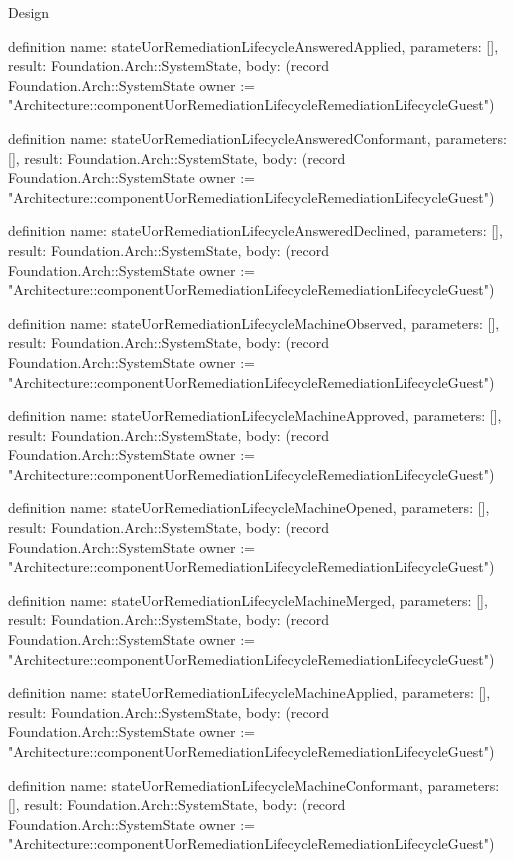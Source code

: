 \begin{lexlean}{Design}
\begin{semanticmodule}
definition{
  name: stateUorRemediationLifecycleAnsweredApplied,
  parameters: [],
  result: Foundation.Arch::SystemState,
  body: (record Foundation.Arch::SystemState {owner := "Architecture::componentUorRemediationLifecycleRemediationLifecycleGuest"})
}

definition{
  name: stateUorRemediationLifecycleAnsweredConformant,
  parameters: [],
  result: Foundation.Arch::SystemState,
  body: (record Foundation.Arch::SystemState {owner := "Architecture::componentUorRemediationLifecycleRemediationLifecycleGuest"})
}

definition{
  name: stateUorRemediationLifecycleAnsweredDeclined,
  parameters: [],
  result: Foundation.Arch::SystemState,
  body: (record Foundation.Arch::SystemState {owner := "Architecture::componentUorRemediationLifecycleRemediationLifecycleGuest"})
}

definition{
  name: stateUorRemediationLifecycleMachineObserved,
  parameters: [],
  result: Foundation.Arch::SystemState,
  body: (record Foundation.Arch::SystemState {owner := "Architecture::componentUorRemediationLifecycleRemediationLifecycleGuest"})
}

definition{
  name: stateUorRemediationLifecycleMachineApproved,
  parameters: [],
  result: Foundation.Arch::SystemState,
  body: (record Foundation.Arch::SystemState {owner := "Architecture::componentUorRemediationLifecycleRemediationLifecycleGuest"})
}

definition{
  name: stateUorRemediationLifecycleMachineOpened,
  parameters: [],
  result: Foundation.Arch::SystemState,
  body: (record Foundation.Arch::SystemState {owner := "Architecture::componentUorRemediationLifecycleRemediationLifecycleGuest"})
}

definition{
  name: stateUorRemediationLifecycleMachineMerged,
  parameters: [],
  result: Foundation.Arch::SystemState,
  body: (record Foundation.Arch::SystemState {owner := "Architecture::componentUorRemediationLifecycleRemediationLifecycleGuest"})
}

definition{
  name: stateUorRemediationLifecycleMachineApplied,
  parameters: [],
  result: Foundation.Arch::SystemState,
  body: (record Foundation.Arch::SystemState {owner := "Architecture::componentUorRemediationLifecycleRemediationLifecycleGuest"})
}

definition{
  name: stateUorRemediationLifecycleMachineConformant,
  parameters: [],
  result: Foundation.Arch::SystemState,
  body: (record Foundation.Arch::SystemState {owner := "Architecture::componentUorRemediationLifecycleRemediationLifecycleGuest"})
}


\end{semanticmodule}
\end{lexlean}
